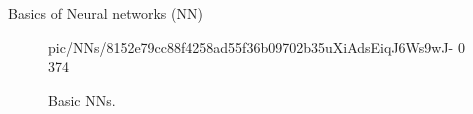 \documentclass{beamer}
\begin{document}

    
    \begin{frame}{Basics of Neural networks (NN)}
        \begin{figure}
            \centering
            {pic/NNs/8152e79cc88f4258ad55f36b09702b35uXiAdsEiqJ6Ws9wJ-} %
            {0} %
            {374} %
            \caption{Basic NNs.}%
            \label{fig:basic_nns}
        \end{figure}
    \end{frame}
\end{document}
